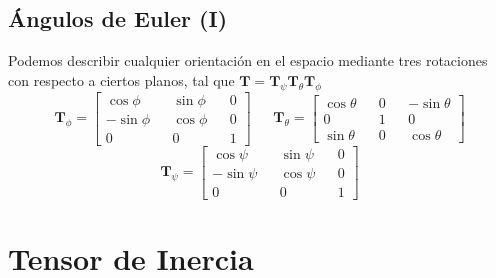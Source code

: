 \subsection{Ángulos de Euler (I)}
Podemos describir cualquier orientación en el espacio mediante tres rotaciones con respecto a ciertos planos, tal que $\mathbf{T} = \mathbf{T}_\psi \mathbf{T}_\theta \mathbf{T}_\phi$
\[\mathbf{T}_\phi = \left[\begin{matrix}
    \cos\phi && \sin\phi&& 0\\
    -\sin\phi && \cos\phi && 0\\
    0 && 0 && 1
\end{matrix}\right] \ \ \ \ \ \ \ 
\mathbf{T}_\theta = \left[\begin{matrix}
    \cos\theta && 0 && -\sin\theta \\
    0&& 1&& 0\\
    \sin\theta&& 0&& \cos\theta
\end{matrix}\right]\]
\[\mathbf{T}_\psi = \left[\begin{matrix}
    \cos\psi && \sin\psi&& 0\\
    -\sin\psi && \cos\psi && 0\\
    0 && 0 && 1
\end{matrix}\right]\]
\vspace{-15pt}
\section{Tensor de Inercia}
\vspace{-15pt}
